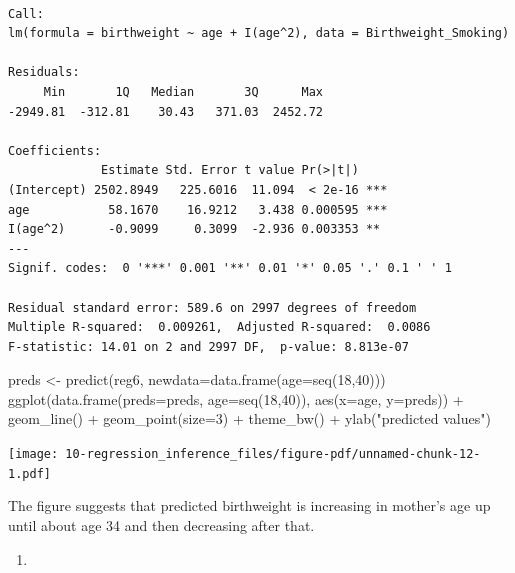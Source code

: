 \documentclass[
  letterpaper,
  DIV=11,
  numbers=noendperiod]{scrreprt}
\newenvironment{Shaded}{\begin{snugshade}}{\end{snugshade}}
\newcommand{\AttributeTok}[1]{\textcolor[rgb]{0.40,0.45,0.13}{#1}}
\newcommand{\DecValTok}[1]{\textcolor[rgb]{0.68,0.00,0.00}{#1}}
\newcommand{\FunctionTok}[1]{\textcolor[rgb]{0.28,0.35,0.67}{#1}}
\newcommand{\NormalTok}[1]{\textcolor[rgb]{0.00,0.23,0.31}{#1}}
\newcommand{\OtherTok}[1]{\textcolor[rgb]{0.00,0.23,0.31}{#1}}
\newcommand{\SpecialCharTok}[1]{\textcolor[rgb]{0.37,0.37,0.37}{#1}}
\newcommand{\StringTok}[1]{\textcolor[rgb]{0.13,0.47,0.30}{#1}}
\providecommand{\tightlist}{%
  \setlength{\itemsep}{0pt}\setlength{\parskip}{0pt}}\usepackage{longtable,booktabs,array}
\begin{document}
\begin{verbatim}

Call:
lm(formula = birthweight ~ age + I(age^2), data = Birthweight_Smoking)

Residuals:
     Min       1Q   Median       3Q      Max 
-2949.81  -312.81    30.43   371.03  2452.72 

Coefficients:
             Estimate Std. Error t value Pr(>|t|)    
(Intercept) 2502.8949   225.6016  11.094  < 2e-16 ***
age           58.1670    16.9212   3.438 0.000595 ***
I(age^2)      -0.9099     0.3099  -2.936 0.003353 ** 
---
Signif. codes:  0 '***' 0.001 '**' 0.01 '*' 0.05 '.' 0.1 ' ' 1

Residual standard error: 589.6 on 2997 degrees of freedom
Multiple R-squared:  0.009261,  Adjusted R-squared:  0.0086 
F-statistic: 14.01 on 2 and 2997 DF,  p-value: 8.813e-07
\end{verbatim}

\begin{Shaded}
\begin{Highlighting}[]
\NormalTok{preds }\OtherTok{\textless{}{-}} \FunctionTok{predict}\NormalTok{(reg6, }\AttributeTok{newdata=}\FunctionTok{data.frame}\NormalTok{(}\AttributeTok{age=}\FunctionTok{seq}\NormalTok{(}\DecValTok{18}\NormalTok{,}\DecValTok{40}\NormalTok{)))}
\FunctionTok{ggplot}\NormalTok{(}\FunctionTok{data.frame}\NormalTok{(}\AttributeTok{preds=}\NormalTok{preds, }\AttributeTok{age=}\FunctionTok{seq}\NormalTok{(}\DecValTok{18}\NormalTok{,}\DecValTok{40}\NormalTok{)), }\FunctionTok{aes}\NormalTok{(}\AttributeTok{x=}\NormalTok{age, }\AttributeTok{y=}\NormalTok{preds)) }\SpecialCharTok{+} 
  \FunctionTok{geom\_line}\NormalTok{() }\SpecialCharTok{+} 
  \FunctionTok{geom\_point}\NormalTok{(}\AttributeTok{size=}\DecValTok{3}\NormalTok{) }\SpecialCharTok{+} 
  \FunctionTok{theme\_bw}\NormalTok{() }\SpecialCharTok{+} 
  \FunctionTok{ylab}\NormalTok{(}\StringTok{"predicted values"}\NormalTok{)}
\end{Highlighting}
\end{Shaded}

\texttt{[image: 10-regression\_inference\_files/figure-pdf/unnamed-chunk-12-1.pdf]}

The figure suggests that predicted birthweight is increasing in mother's
age up until about age 34 and then decreasing after that.

\begin{enumerate}
\def\labelenumi{\arabic{enumi}.}
\setcounter{enumi}{6}
\tightlist
\item
\end{enumerate}
\end{document}
